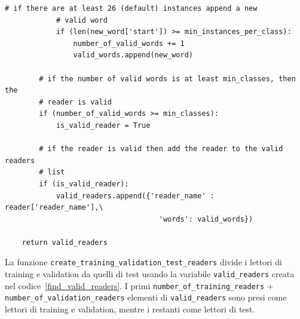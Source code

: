 \documentclass[12pt,a4paper,titlepage]{article}
\begin{document}
\begin{lstlisting}[language=iPython,firstnumber=10, caption=Funzione \texttt{find\_valid\_readers}, label=find_valid_readers,captionpos=b]
            # if there are at least 26 (default) instances append a new 
            # valid word
            if (len(new_word['start']) >= min_instances_per_class):
                number_of_valid_words += 1
                valid_words.append(new_word)

        # if the number of valid words is at least min_classes, then the 
        # reader is valid
        if (number_of_valid_words >= min_classes):
            is_valid_reader = True

        # if the reader is valid then add the reader to the valid readers
        # list
        if (is_valid_reader):
            valid_readers.append({'reader_name' : reader['reader_name'],\
                                    'words': valid_words})

    return valid_readers
\end{lstlisting}

La funzione \texttt{create\_training\_validation\_test\_readers} divide i lettori di training e validation da quelli di test usando la variabile \texttt{valid\_readers} creata nel codice~\ref{find_valid_readers}. I primi \texttt{number\_of\_training\_readers} + \texttt{number\_of\_validation\_readers} elementi di \texttt{valid\_readers} sono presi come lettori di training e validation, mentre i restanti come lettori di test.
\end{document}
